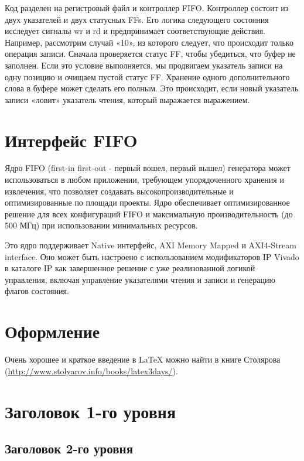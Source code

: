 

Код разделен на регистровый файл и контроллер FIFO. Контроллер состоит из двух указателей и двух статусных FFs. Его логика следующего состояния исследует сигналы wr и rd и предпринимает соответствующие действия. Например, рассмотрим случай «10», из которого следует, что происходит только операция записи. Сначала проверяется статус FF, чтобы убедиться, что буфер не заполнен. Если это условие выполняется, мы продвигаем указатель записи на одну позицию и очищаем пустой статус FF. Хранение одного дополнительного слова в буфере может сделать его полным. Это происходит, если новый указатель записи «ловит» указатель чтения, который выражается выражением.

\section{Интерфейс FIFO}

Ядро FIFO (first-in first-out - первый вошел, первый вышел) генератора может использоваться в любом приложении, требующем упорядоченного
хранения и извлечения, что позволяет создавать высокопроизводительные и оптимизированные по площади проекты.
Ядро обеспечивает оптимизированное решение для всех конфигураций FIFO и  максимальную производительность (до 500 МГц) при использовании
минимальных ресурсов.

Это ядро поддерживает Native интерфейс, AXI Memory Mapped и AXI4-Stream interface.
Оно может быть настроено с использованием модификаторов IP Vivado в каталоге
IP как завершенное решение с уже реализованной логикой управления, включая управление указателями
чтения и записи и генерацию флагов состояния.


\section{Оформление}

Очень хорошее и краткое введение в LaTeX можно найти в книге Столярова (\href{url}{http://www.stolyarov.info/books/latex3days/}).

\section{Заголовок 1-го уровня}
\subsection{Заголовок 2-го уровня}
